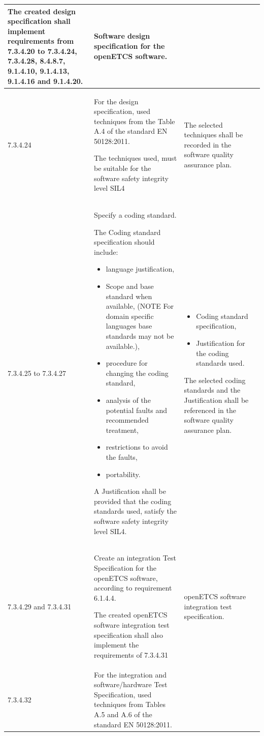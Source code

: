 \documentclass{template/openetcs_report}
\begin{document}
{\begin{longtable}{|p{2cm}|p{9cm}|p{3cm}|}
The created design specification shall implement requirements from 7.3.4.20 to 7.3.4.24, 7.3.4.28, 8.4.8.7, 9.1.4.10, 9.1.4.13, 9.1.4.16 and 9.1.4.20.
& Software design specification for the openETCS software.\\ 
\hline
7.3.4.24 & For the design specification, used techniques from the Table A.4 of the standard EN 50128:2011.

The techniques used, must be suitable for the software safety integrity level SIL4
& The selected techniques shall be recorded in the software quality assurance plan.\\ 
\hline
7.3.4.25 to 7.3.4.27 & 
Specify a coding standard.

The Coding standard specification should include:
\begin{itemize}\itemsep=0pt
  \item language justification,
  \item Scope and base standard when available, (NOTE For domain specific languages base standards may not be available.),
  \item procedure for changing the coding standard,
  \item analysis of the potential faults and recommended treatment,
  \item restrictions to avoid the faults,
  \item portability.
\end{itemize}

A Justification shall be provided that the coding standards used, satisfy the software safety integrity level SIL4.
& 
\begin{itemize}\itemsep=0pt
  \item Coding standard specification,
  \item Justification for the coding standards used.
\end{itemize}

The selected coding standards and the Justification shall be referenced in the software quality assurance plan.\\ 
\hline
7.3.4.29 and 7.3.4.31 & Create an integration Test Specification for the openETCS software, according to requirement 6.1.4.4.

The created openETCS software integration test specification shall also implement the requirements of 7.3.4.31
& openETCS software integration test specification.\\ 
\hline
7.3.4.32 & For the integration and software/hardware Test Specification, used techniques from Tables A.5 and A.6 of the standard EN 50128:2011.


\end{longtable}}
\end{document}
